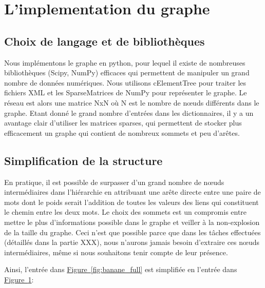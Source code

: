 \section{L'implementation du graphe}

\subsection{Choix de langage et de bibliothèques}
Nous implémentons le graphe en python, pour lequel il existe de nombreuses 
bibliothèques (Scipy, NumPy) efficaces qui permettent de manipuler un grand 
nombre de données numériques. Nous utilisons cElementTree pour traiter les 
fichiers XML et les SparseMatrices de NumPy pour représenter le graphe. Le 
réseau est alors une matrice NxN où N est le nombre de nœuds différents dans le 
graphe. Etant donné le grand nombre d'entrées dans les dictionnaires, il y a un 
avantage clair d'utiliser les matrices sparses, qui permettent de stocker plus 
efficacement un graphe qui contient de nombreux sommets et peu d'arêtes.

\subsection{Simplification de la structure}
En pratique, il est possible de surpasser d'un grand nombre de nœuds 
intermédiaires dans l'hiérarchie en attribuant une arête directe entre une paire 
de mots dont le poids serait l'addition de toutes les valeurs des liens qui 
constituent le chemin entre les deux mots. Le choix des sommets est un compromis 
entre mettre le plus d'informations possible dans le graphe et veiller à la 
non-explosion de la taille du graphe. Ceci n'est que possible parce que dans les 
tâches effectuées (détaillés dans la partie XXX), nous n'aurons jamais besoin 
d'extraire ces nœuds intermédiaires, même si nous souhaitons tenir compte de 
leur présence.

Ainsi, l'entrée dans \hyperref[fig:banane_full]{Figure~\ref*{fig:banane_full}} 
est simplifiée en l'entrée dans 
\hyperref[fig:banane_simple]{Figure~\ref*{fig:banane_simple}}:

\begin{figure}
\centering
\parbox{5cm}{
\def\svgscale{0.5}

\caption{}
\label{fig:banane_full}}
\qquad
\begin{minipage}{5cm}
\def\svgscale{0.5}

\caption{}
\label{fig:banane_simple}
\end{minipage}
\end{figure}


